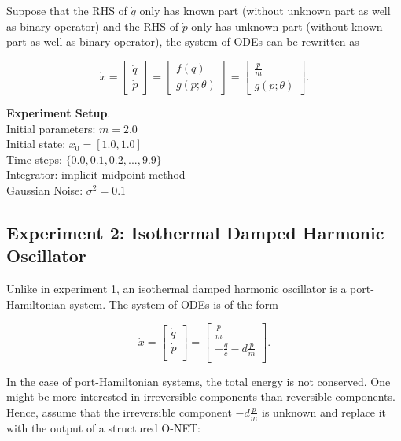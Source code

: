 \documentclass[
	parskip, 			   %
	twoside, 			   %
	DIV=14, 			   %
	BCOR=15.0mm, 		   %
	headsepline, 		   %
	open=right, 		   %
	captions=tableheading, %
	bibliography=totoc,    %
	numbers=noenddot       %
]{scrreprt}
\begin{document}
Suppose that the RHS of $\dot{q}$ only has known part (without unknown part as well as binary operator) and the RHS of $\dot{p}$ only has unknown part (without known part as well as binary operator), the system of ODEs can be rewritten as

\begin{equation}
    \label{eq:structured_ODE_udho}
    \dot{x} =
    \begin{bmatrix}
    \dot{q}\\
    \dot{p}
    \end{bmatrix}
    =
    \begin{bmatrix}
    {f(q)}\\
    {g(p;\theta)}
    \end{bmatrix}
    =
    \begin{bmatrix}
    \frac{p}{m}\\
    g(p;\theta)
    \end{bmatrix}.
\end{equation}

\textbf{Experiment Setup}.\\
Initial parameters: $m = 2.0$\\
Initial state: $x_0 = [1.0, 1.0]$\\
Time steps: $\{ 0.0, 0.1, 0.2, ..., 9.9 \}$\\
Integrator: implicit midpoint method\\
Gaussian Noise: $\sigma^2 = 0.1$

\subsection{Experiment 2: Isothermal Damped Harmonic Oscillator}
Unlike in experiment 1, an isothermal damped harmonic oscillator is a port-Hamiltonian system. The system of ODEs is of the form

\begin{equation}
    \label{eq:ODE_idho}
    \dot{x} =
    \begin{bmatrix}
    \dot{q}\\
    \dot{p}\\
    \end{bmatrix}
    =
    \begin{bmatrix}
    \frac{p}{m}\\
    -\frac{q}{c}-d\frac{p}{m}\\
    \end{bmatrix}.
\end{equation}

In the case of port-Hamiltonian systems, the total energy is not conserved. One might be more interested in irreversible components than reversible components. Hence, assume that the irreversible component $-d\frac{p}{m}$ is unknown and replace it with the output of a structured O-NET:
\end{document}

